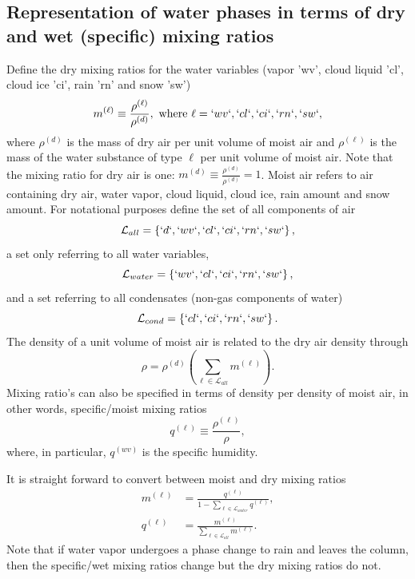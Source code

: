 \documentclass{agujournal}
\begin{document}
{\subsection{Representation of water phases in terms of dry and wet (specific) mixing ratios}\label{sec:mixing_ratios}
Define the dry mixing ratios for the water variables (vapor 'wv', cloud liquid 'cl', cloud ice 'ci', rain 'rn' and snow 'sw')
\begin{equation}
m^{(\ell)}\equiv \frac{\rho^{(\ell)}}{\rho^{(d)}}, \text{ where }\ell=`wv`,`cl`,`ci`,`rn`,`sw`,\label{eq:mx}
\end{equation}
where $\rho^{(d)}$ is the mass of dry air per unit volume of moist air and $\rho^{(\ell)}$ is the mass of the water substance of type $\ell$ per unit volume of moist air. Note that the mixing ratio for dry air is one: $m^{(d)}\equiv \frac{\rho^{(d)}}{\rho^{(d)}}=1$. 
Moist air refers to air containing dry air, water vapor, cloud liquid, cloud ice, rain amount and snow amount. For notational purposes define the set of all components of air
\begin{equation}
\mathcal{L}_{all}=\left\{ `d`,`wv`,`cl`,`ci`,`rn`,`sw`\right\},
\end{equation}
a set only referring to all water variables,
\begin{equation}
\mathcal{L}_{water}=\left\{`wv`,`cl`,`ci`,`rn`,`sw`\right\},
\end{equation}
and a set referring to all condensates (non-gas components of water)
\begin{equation}
\mathcal{L}_{cond}=\left\{`cl`,`ci`,`rn`,`sw`\right\}.
\end{equation}
The density of a unit volume of moist air is related to the dry air density through
\begin{equation}
\rho=\rho^{(d)}\left(\sum_{\ell \in \mathcal{L}_{all}} m^{(\ell)}\right).
\end{equation}
Mixing ratio's can also be specified in terms of density per density of moist air, in other words, specific/moist mixing ratios
\begin{equation}
q^{(\ell)}\equiv \frac{\rho^{(\ell)}}{\rho},\label{eq:qx}
\end{equation}
where, in particular, $q^{(wv)}$ is the specific humidity. 


It is straight forward to convert between moist and dry mixing ratios
\begin{align}
m^{(\ell)}&=\frac{q^{(\ell)}}{1-\sum_{\ell \in \mathcal{L}_{water}} q^{(\ell)}},\label{eq:mxqx}\\
q^{(\ell)}&=\frac{m^{(\ell)}}{\sum_{\ell \in \mathcal{L}_{all}} m^{(\ell)}}.
\end{align}
Note that if water vapor undergoes a phase change to rain and leaves the column, then the specific/wet mixing ratios change but the dry mixing ratios do not.


}
\end{document}
